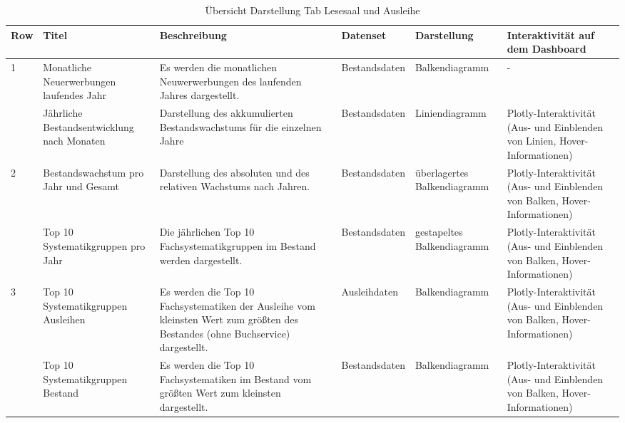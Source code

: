     \begingroup
    \setlength{\tabcolsep}{12pt} %
    \renewcommand{\arraystretch}{1.5} 
    \begin{table}[H]
        \centering
        \begin{adjustbox}{max width=\textwidth}
        \begin{tabular}{p{}p{}p{}p{}p{}p{}}
           \toprule
           Row        &Titel &Beschreibung &Datenset &Darstellung &Interaktivität auf dem Dashboard\\
           \midrule
            1           &Monatliche Neuerwerbungen laufendes Jahr&Es werden die monatlichen Neuwerwerbungen des laufenden Jahres dargestellt.&Bestandsdaten&Balkendiagramm&-\\
                        &Jährliche Bestandsentwicklung nach Monaten&Darstellung des akkumulierten Bestandswachstums für die einzelnen Jahre&Bestandsdaten&Liniendiagramm    &Plotly-Interaktivität (Aus- und Einblenden von Linien, Hover-Informationen)\\          
            \midrule
            2           &Bestandswachstum pro Jahr und Gesamt&Darstellung des absoluten und des relativen Wachstums nach Jahren.&Bestandsdaten&überlagertes Balkendiagramm&Plotly-Interaktivität (Aus- und Einblenden von Balken, Hover-Informationen)\\
                        &Top 10 Systematikgruppen pro Jahr&Die jährlichen Top 10 Fachsystematikgruppen im Bestand werden dargestellt.&Bestandsdaten    &gestapeltes Balkendiagramm&Plotly-Interaktivität (Aus- und Einblenden von Balken, Hover-Informationen)\\
            \midrule
            3           &Top 10 Systematikgruppen Ausleihen&Es werden die Top 10 Fachsystematiken der Ausleihe vom kleinsten Wert zum größten des Bestandes (ohne Buchservice) dargestellt.&Ausleihdaten&Balkendiagramm&Plotly-Interaktivität (Aus- und Einblenden von Balken, Hover-Informationen)\\
                        &Top 10 Systematikgruppen Bestand&Es werden die Top 10 Fachsystematiken im Bestand vom größten Wert zum kleinsten dargestellt.&Bestandsdaten&Balkendiagramm&Plotly-Interaktivität (Aus- und Einblenden von Balken, Hover-Informationen)\\

        \bottomrule
        \end{tabular}
        \end{adjustbox}
        \caption{%
            Übersicht Darstellung Tab Lesesaal und Ausleihe
        }
        \label{tab:Darstellung Tab Lesesaal und Ausleihe}
        \end{table}
    \endgroup

